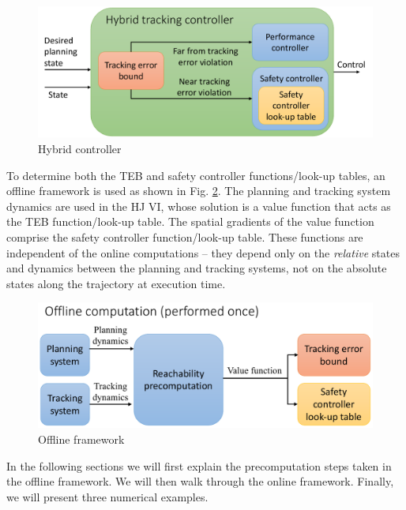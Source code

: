 \begin{figure}[h!]
  \centering
	\includegraphics[width=0.9\columnwidth]{fig/hybrid_controller}
	\caption{Hybrid controller}
	\label{fig:hybrid_ctrl}
\end{figure}

To determine both the TEB and safety controller functions/look-up tables, an offline framework is used as shown in Fig. \ref{fig:fw_offline}. 
The planning and tracking system dynamics are used in the HJ VI, whose solution is a value function that acts as the TEB function/look-up table. 
The spatial gradients of the value function comprise the safety controller function/look-up table. 
These functions are independent of the online computations -- they depend only on the \textit{relative} states and dynamics between the planning and tracking systems, not on the absolute states along the trajectory at execution time.

\begin{figure}[h!]
  \centering
	\includegraphics[width=0.9\columnwidth]{fig/framework_offline}
	\caption{Offline framework}
	\label{fig:fw_offline}
\end{figure}
In the following sections we will first explain the precomputation steps taken in the offline framework. 
We will then walk through the online framework.
Finally, we will present three numerical examples.

